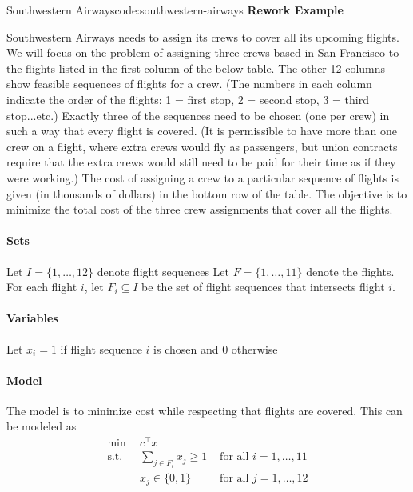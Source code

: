 




\begin{examplewithcode}{Southwestern Airways\footnotemark}{code:southwestern-airways}
\label{example:southwestern-airways}
\textbf{Rework Example}

Southwestern Airways needs to assign its crews to cover all its upcoming flights.  We will focus on the problem of assigning three crews based in San Francisco to the flights listed in the first column of the below table.  The other 12 columns show feasible sequences of flights for a crew.  (The numbers in each column indicate the order of the flights: 1 = first stop, 2 = second stop, 3 = third stop...etc.) Exactly three of the sequences need to be chosen (one per crew) in such a way that every flight is covered. (It is permissible to have more than one crew on a flight, where extra crews would fly as passengers, but union contracts require that the extra crews would still need to be paid for their time as if they were working.) The cost of assigning a crew to a particular sequence of flights is given (in thousands of dollars) in the bottom row of the table.  The objective is to minimize the total cost of the three crew assignments that cover all the flights.


\paragraph{Sets}
Let $I = \{1,\dots, 12\}$ denote flight sequences
Let $F = \{1, \dots, 11\}$ denote the flights.
For each flight $i$, let $F_i \subseteq I$ be the set of flight sequences that intersects flight $i$.
\paragraph{Variables}
Let $x_i = 1$ if flight sequence $i$ is chosen and $0$ otherwise
\paragraph{Model}
The model is to minimize cost while respecting that flights are covered.  This can be modeled as 
\begin{align*}
\min \ \ & c^\top x\\
\text{s.t.} \ \ &  \sum_{j \in F_i} x_j \geq 1 & \text{ for all } i=1, \dots, 11\\
& x_j \in \{0,1\}  & \text{ for all } j=1, \dots, 12
\end{align*}


\end{examplewithcode}
